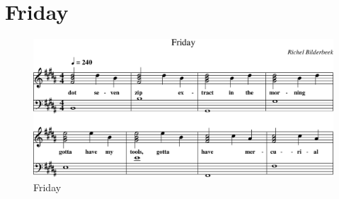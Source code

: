 \section{Friday}



\begin{figure}[!htbp]
  \includegraphics[width=\textwidth,height=\textheight,keepaspectratio]{../songs/54_friday.png}
  \caption{Friday}
  \label{fig:54_friday}
\end{figure}
